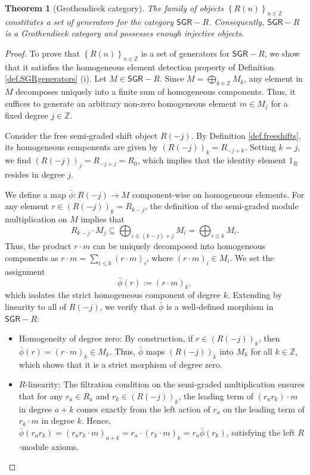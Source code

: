 \documentclass[reqno]{amsart}
\newtheorem{theorem}{Theorem}[section]
\theoremstyle{definition}
\theoremstyle{remark}
\numberwithin{equation}{section}
\begin{document}
\begin{theorem}[Grothendieck category]\label{Grothendieckcategory}
The family of objects $\left\{R(n)\right\}_{n \in \mathbb{Z}}$ constitutes a set of generators for the category $\mathsf{SGR}-R$. Consequently, $\mathsf{SGR}-R$ is a Grothendieck category and possesses enough injective objects.
\end{theorem}
\begin{proof}
To prove that $\left\{R(n)\right\}_{n \in \mathbb{Z}}$ is a set of generators for $\mathsf{SGR}-R$, we show that it satisfies the homogeneous element detection property of Definition \ref{def.SGRgenerators} (i). 
Let $M \in \mathsf{SGR}-R$. Since $M = \bigoplus_{k \in \mathbb{Z}} M_k$, any element in $M$ decomposes uniquely into a finite sum of homogeneous components. Thus, it suffices to generate an arbitrary non-zero homogeneous element $m \in M_j$ for a fixed degree $j \in \mathbb{Z}$.

Consider the free semi-graded shift object $R(-j)$. By Definition \ref{def.freeshifts}, its homogeneous components are given by $(R(-j))_k = R_{-j+k}$. Setting $k = j$, we find $(R(-j))_j = R_{-j+j} = R_0$, which implies that the identity element $1_R$ resides in degree $j$.

We define a map $\bar{\phi}: R(-j) \to M$ component-wise on homogeneous elements. For any element $r \in (R(-j))_k = R_{k-j}$, the definition of the semi-graded module multiplication on $M$ implies that 
\[ 
R_{k-j} \cdot M_j \subseteq \bigoplus_{i \leq (k-j)+j} M_i = \bigoplus_{i \leq k} M_i. 
\]
Thus, the product $r \cdot m$ can be uniquely decomposed into homogeneous components as $r \cdot m = \sum_{i \leq k} (r \cdot m)_i$, where $(r \cdot m)_i \in M_i$. We set the assignment 
\[
\bar{\phi}(r) := (r \cdot m)_k,
\]
which isolates the strict homogeneous component of degree $k$. Extending by linearity to all of $R(-j)$, we verify that $\bar{\phi}$ is a well-defined morphism in $\mathsf{SGR}-R$:
\begin{itemize}
\item Homogeneity of degree zero: By construction, if $r \in (R(-j))_k$, then $\bar{\phi}(r) = (r \cdot m)_k \in M_k$. Thus, $\bar{\phi}$ maps $(R(-j))_k$ into $M_k$ for all $k \in \mathbb{Z}$, which shows that it is a strict morphism of degree zero.

\item $R$-linearity: The filtration condition on the semi-graded multiplication ensures that for any $r_a \in R_a$ and $r_k \in (R(-j))_k$, the leading term of $(r_a r_k) \cdot m$ in degree $a+k$ comes exactly from the left action of $r_a$ on the leading term of $r_k \cdot m$ in degree $k$. Hence, $\bar{\phi}(r_a r_k) = (r_a r_k \cdot m)_{a+k} = r_a \cdot (r_k \cdot m)_k = r_a \bar{\phi}(r_k)$, satisfying the left $R$-module axioms.
\end{itemize}


\end{proof}
\end{document}
